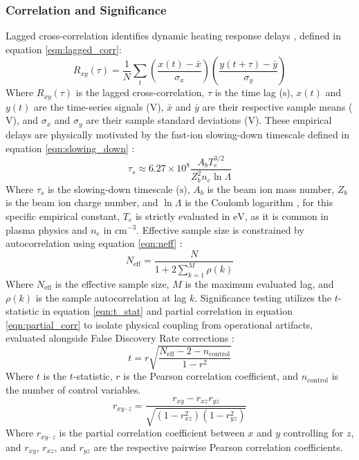 \subsubsection{Correlation and Significance}
Lagged cross-correlation identifies dynamic heating response delays \cite{Zhong2020}, defined in equation \ref{eqn:lagged_corr}:
\begin{equation}
\label{eqn:lagged_corr}
R_{xy}(\tau) = \frac{1}{N} \sum_{t} \left(\frac{x(t) - \bar{x}}{\sigma_x}\right)\left(\frac{y(t+\tau) - \bar{y}}{\sigma_y}\right)
\end{equation}
Where $R_{xy}(\tau)$ is the lagged cross-correlation, $\tau$ is the time lag ($\text{s}$), $x(t)$ and $y(t)$ are the time-series signals ($\text{V}$), $\bar{x}$ and $\bar{y}$ are their respective sample means ($\text{V}$), and $\sigma_x$ and $\sigma_y$ are their sample standard deviations ($\text{V}$). These empirical delays are physically motivated by the fast-ion slowing-down timescale defined in equation \ref{eqn:slowing_down} \cite{Salewski2025}:
\begin{equation}
\label{eqn:slowing_down}
\tau_s \approx 6.27 \times 10^8 \frac{A_b T_e^{3/2}}{Z_b^2 n_e \ln \Lambda}
\end{equation}
Where $\tau_s$ is the slowing-down timescale ($\text{s}$), $A_b$ is the beam ion mass number, $Z_b$ is the beam ion charge number, and $\ln \Lambda$ is the Coulomb logarithm  \cite{chen2016introduction}, for this specific empirical constant, $T_e$ is strictly evaluated in $\text{eV}$, as it is common in plasma physics and $n_e$ in $\text{cm}^{-3}$. Effective sample size is constrained by autocorrelation using equation \ref{eqn:neff} \cite{shumway2017time}:
\begin{equation}
\label{eqn:neff}
N_{\text{eff}} = \frac{N}{1 + 2 \sum_{k=1}^{M} \rho(k)}
\end{equation}
Where $N_{\text{eff}}$ is the effective sample size, $M$ is the maximum evaluated lag, and $\rho(k)$ is the sample autocorrelation at lag $k$. Significance testing utilizes the $t$-statistic in equation \ref{eqn:t_stat} \cite{shumway2017time} and partial correlation in equation \ref{eqn:partial_corr} to isolate physical coupling from operational artifacts, evaluated alongside False Discovery Rate corrections \cite{james2021statistical}:
\begin{equation}
\label{eqn:t_stat}
t = r \sqrt{\frac{N_{\text{eff}} - 2 - n_{\text{control}}}{1 - r^2}}
\end{equation}
Where $t$ is the $t$-statistic, $r$ is the Pearson correlation coefficient, and $n_{\text{control}}$ is the number of control variables.
\begin{equation}
\label{eqn:partial_corr}
r_{xy \cdot z} = \frac{r_{xy} - r_{xz}r_{yz}}{\sqrt{(1 - r_{xz}^2)(1 - r_{yz}^2)}}
\end{equation}
Where $r_{xy \cdot z}$ is the partial correlation coefficient between $x$ and $y$ controlling for $z$, and $r_{xy}$, $r_{xz}$, and $r_{yz}$ are the respective pairwise Pearson correlation coefficients.

